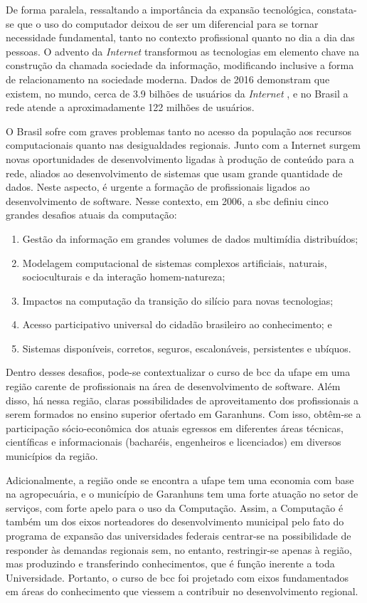 \documentclass[
	12pt,				%
	openright,			%
  oneside,     %
	a4paper,			%
 hyphens,
	chapter=TITLE,		%
	english,			%
	french,				%
	spanish,			%
	brazil				%
	]{abntex2}
\begin{document}
De forma paralela, ressaltando a importância da expansão tecnológica, constata-se que o uso do computador deixou de ser um diferencial para se tornar necessidade fundamental, tanto no contexto profissional quanto no dia a dia das pessoas. O advento da \textit{Internet} transformou as tecnologias em elemento chave na construção da chamada sociedade da informação, modificando inclusive a forma de relacionamento na sociedade moderna. Dados de 2016 demonstram que existem, no mundo, cerca de 3.9 bilhões de usuários da \textit{Internet} \cite{sanou2018measuring}, e no Brasil a rede atende a aproximadamente 122 milhões de usuários.

O Brasil sofre com graves problemas tanto no acesso da população aos recursos computacionais quanto nas desigualdades regionais. Junto com a Internet surgem novas oportunidades de desenvolvimento ligadas à produção de conteúdo para a rede, aliados ao desenvolvimento de sistemas que usam grande quantidade de dados. Neste aspecto, é urgente a formação de profissionais ligados ao desenvolvimento de software. Nesse contexto, em 2006, a \acrshort{sbc} definiu cinco grandes desafios atuais da computação:

\begin{enumerate}
    \item Gestão da informação em grandes volumes de dados multimídia distribuídos;
    \item Modelagem computacional de sistemas complexos artificiais, naturais, socioculturais e da interação homem-natureza;
    \item Impactos na computação da transição do silício para novas tecnologias;
    \item Acesso participativo universal do cidadão brasileiro ao conhecimento; e
    \item Sistemas disponíveis, corretos, seguros, escalonáveis, persistentes e ubíquos.
\end{enumerate}
	
Dentro desses desafios, pode-se contextualizar o curso de \acrshort{bcc} da \acrshort{ufape} em uma região carente de profissionais na área de desenvolvimento de software. Além disso, há nessa região, claras possibilidades de aproveitamento dos profissionais a serem formados no ensino superior ofertado em Garanhuns. Com isso, obtêm-se a participação sócio-econômica dos atuais egressos em diferentes áreas técnicas, científicas e informacionais (bacharéis, engenheiros e licenciados) em diversos municípios da região.

Adicionalmente, a região onde se encontra a \acrshort{ufape} tem uma economia com base na agropecuária, e o município de Garanhuns tem uma forte atuação no setor de serviços, com forte apelo para o uso da Computação. Assim, a Computação é também um dos eixos norteadores do desenvolvimento municipal pelo fato do programa de expansão das universidades federais centrar-se na possibilidade de responder às demandas regionais sem, no entanto, restringir-se apenas à região, mas produzindo e transferindo conhecimentos, que é função inerente a toda Universidade. Portanto, o curso de \acrshort{bcc} foi projetado com eixos fundamentados em áreas do conhecimento que viessem a contribuir no desenvolvimento regional.
\end{document}
